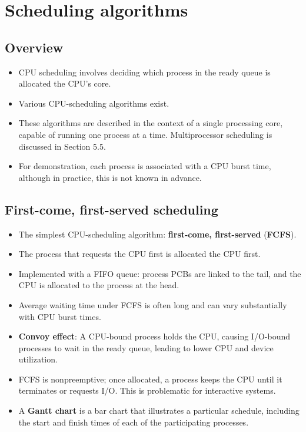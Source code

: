 \section{Scheduling algorithms}\label{sec:5.3}

\subsection{Overview}
\begin{itemize}
    \item CPU scheduling involves deciding which process in the ready queue is allocated the CPU's core.
    \item Various CPU-scheduling algorithms exist.
    \item These algorithms are described in the context of a single processing core, capable of running one process at a time. Multiprocessor scheduling is discussed in Section 5.5.
    \item For demonstration, each process is associated with a CPU burst time, although in practice, this is not known in advance.
\end{itemize}

\subsection{First-come, first-served scheduling}
\begin{itemize}
    \item The simplest CPU-scheduling algorithm: \textbf{first-come, first-served} (\textbf{FCFS}).
    \item The process that requests the CPU first is allocated the CPU first.
    \item Implemented with a FIFO queue: process PCBs are linked to the tail, and the CPU is allocated to the process at the head.
    \item Average waiting time under FCFS is often long and can vary substantially with CPU burst times.
    \item \textbf{Convoy effect}: A CPU-bound process holds the CPU, causing I/O-bound processes to wait in the ready queue, leading to lower CPU and device utilization.
    \item FCFS is nonpreemptive; once allocated, a process keeps the CPU until it terminates or requests I/O. This is problematic for interactive systems.
\item A \textbf{Gantt chart} is a bar chart that illustrates a particular schedule, including the start and finish times of each of the participating processes.
\end{itemize}

